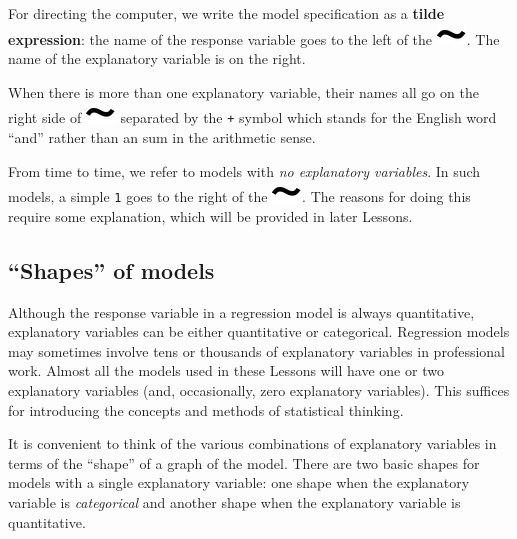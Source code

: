 \documentclass[
  letterpaper,
  DIV=11,
  numbers=noendperiod,
  oneside]{scrartcl}
\begin{document}
For directing the computer, we write the model specification as a
\textbf{tilde expression}: the name of the response variable goes to the
left of the \includegraphics{www/tilde.png}. The name of the explanatory
variable is on the right.

When there is more than one explanatory variable, their names all go on
the right side of \includegraphics{www/tilde.png} separated by the
\texttt{+} symbol which stands for the English word ``and'' rather than
an sum in the arithmetic sense.
{}

From time to time, we refer to models with \emph{no explanatory
variables}. In such models, a simple \texttt{1} goes to the right of the
\includegraphics{www/tilde.png}. The reasons for doing this require some
explanation, which will be provided in later Lessons.

\subsection{``Shapes'' of models}\label{shapes-of-models}

Although the response variable in a regression model is always
quantitative, explanatory variables can be either quantitative or
categorical. Regression models may sometimes involve tens or thousands
of explanatory variables in professional work. Almost all the models
used in these Lessons will have one or two explanatory variables (and,
occasionally, zero explanatory variables). This suffices for introducing
the concepts and methods of statistical thinking.

It is convenient to think of the various combinations of explanatory
variables in terms of the ``shape'' of a graph of the model. There are
two basic shapes for models with a single explanatory variable: one
shape when the explanatory variable is \emph{categorical} and another
shape when the explanatory variable is quantitative.
\end{document}
